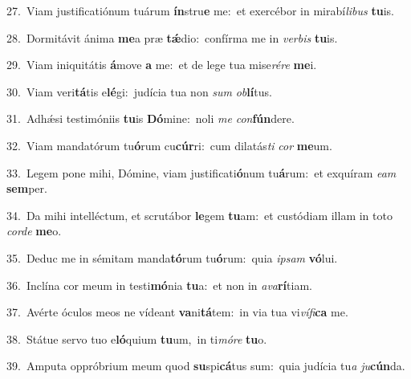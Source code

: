 {\numbfont\textcolor{\numbcolor}{27.}}~Viam justificatiónum tuárum \textbf{ín}\-stru\textbf{e} me:~\star et exercébor in mirabí\-\textit{li}\-\textit{bus} \textbf{tu}\-is.\par
{\numbfont\textcolor{\numbcolor}{28.}}~Dormitávit ánima \textbf{me}\-a præ \textbf{tǽ}\-dio:~\star confírma me in \textit{ver}\-\textit{bis} \textbf{tu}\-is.\par
{\numbfont\textcolor{\numbcolor}{29.}}~Viam iniquitátis \textbf{á}\-move \textbf{a} me:~\star et de lege tua mise\-\textit{ré}\-\textit{re} \textbf{me}\-i.\par
{\numbfont\textcolor{\numbcolor}{30.}}~Viam veri\-\textbf{tá}\-tis e\-\textbf{lé}\-gi:~\star judícia tua non \textit{sum} \textit{ob}\-\textbf{lí}tus.\par
{\numbfont\textcolor{\numbcolor}{31.}}~Adhǽsi testimóniis \textbf{tu}\-is \textbf{Dó}\-mine:~\star noli \textit{me} \textit{con}\-\textbf{fún}dere.\par
{\numbfont\textcolor{\numbcolor}{32.}}~Viam mandatórum tu\-\textbf{ó}\-rum cu\-\textbf{cúr}\-ri:~\star cum dilatás\textit{ti} \textit{cor} \textbf{me}\-um.\par
{\numbfont\textcolor{\numbcolor}{33.}}~Legem pone mihi, Dómine, viam justificati\-\textbf{ó}\-num tu\-\textbf{á}\-rum:~\star et exquíram \textit{e}\-\textit{am} \textbf{sem}\-per.\par
{\numbfont\textcolor{\numbcolor}{34.}}~Da mihi intelléctum, et scrutábor \textbf{le}\-gem \textbf{tu}\-am:~\star et custódiam illam in toto \textit{cor}\-\textit{de} \textbf{me}\-o.\par
{\numbfont\textcolor{\numbcolor}{35.}}~Deduc me in sémitam manda\-\textbf{tó}\-rum tu\-\textbf{ó}\-rum:~\star quia \textit{ip}\-\textit{sam} \textbf{vó}\-lui.\par
{\numbfont\textcolor{\numbcolor}{36.}}~Inclína cor meum in testi\-\textbf{mó}\-nia \textbf{tu}\-a:~\star et non in \textit{a}\-\textit{va}\textbf{rí}tiam.\par
{\numbfont\textcolor{\numbcolor}{37.}}~Avérte óculos meos ne vídeant \textbf{va}\-ni\-\textbf{tá}\-tem:~\star in via tua vi\-\textit{ví}\-\textit{fi}\textbf{ca} me.\par
{\numbfont\textcolor{\numbcolor}{38.}}~Státue servo tuo e\-\textbf{ló}\-quium \textbf{tu}\-um,~\star in ti\-\textit{mó}\-\textit{re} \textbf{tu}\-o.\par
{\numbfont\textcolor{\numbcolor}{39.}}~Amputa oppróbrium meum quod \textbf{su}\-spi\-\textbf{cá}\-tus sum:~\star quia judícia tu\textit{a} \textit{ju}\-\textbf{cún}da.\par
